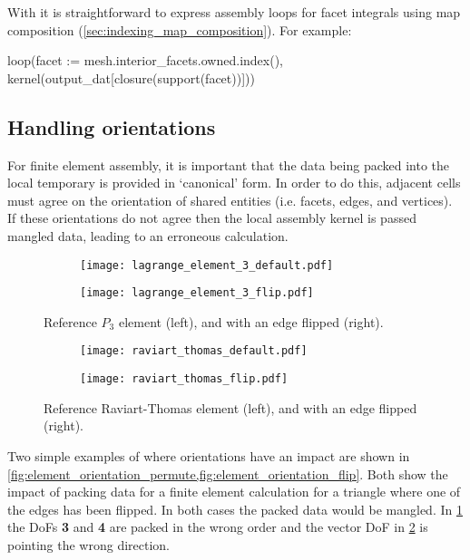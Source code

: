 \documentclass[thesis]{subfiles}
\begin{document}
With  it is straightforward to express assembly loops for facet integrals using map composition (\cref{sec:indexing_map_composition}).
For example:
\begin{pyinline}
  loop(facet := mesh.interior_facets.owned.index(),
       kernel(output_dat[closure(support(facet))]))
\end{pyinline}

\subsection{Handling orientations}
\label{sec:firedrake_orientations}

For finite element assembly, it is important that the data being packed into the local temporary is provided in `canonical' form.
In order to do this, adjacent cells must agree on the orientation of shared entities (i.e. facets, edges, and vertices).
If these orientations do not agree then the local assembly kernel is passed mangled data, leading to an erroneous calculation.

\begin{figure}
  \centering
  \begin{subfigure}{0.45\textwidth}
    \centering
    \texttt{[image: lagrange\_element\_3\_default.pdf]}
  \end{subfigure}
  \begin{subfigure}{0.45\textwidth}
    \centering
    \texttt{[image: lagrange\_element\_3\_flip.pdf]}
  \end{subfigure}
  \caption{Reference $P_3$ element (left), and with an edge flipped (right).}
  \label{fig:element_orientation_permute}
\end{figure}

\begin{figure}
  \centering
  \begin{subfigure}{0.45\textwidth}
    \centering
    \texttt{[image: raviart\_thomas\_default.pdf]}
  \end{subfigure}
  \begin{subfigure}{0.45\textwidth}
    \centering
    \texttt{[image: raviart\_thomas\_flip.pdf]}
  \end{subfigure}
  \caption{Reference Raviart-Thomas element (left), and with an edge flipped (right).}
  \label{fig:element_orientation_flip}
\end{figure}


Two simple examples of where orientations have an impact are shown in \cref{fig:element_orientation_permute,fig:element_orientation_flip}.
Both show the impact of packing data for a finite element calculation for a triangle where one of the edges has been flipped.
In both cases the packed data would be mangled.
In \cref{fig:element_orientation_permute} the DoFs \textbf{3} and \textbf{4} are packed in the wrong order and the vector DoF in \cref{fig:element_orientation_flip} is pointing the wrong direction.
\end{document}
